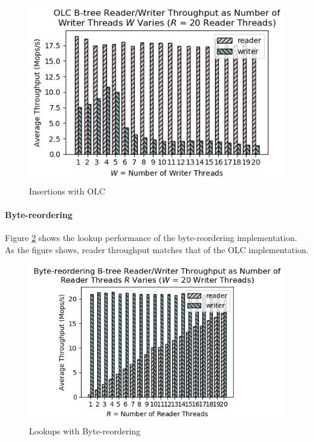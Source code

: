 \documentclass[twocolumn]{article}
\begin{document}
\begin{figure}[ht]
    \centering \includegraphics[width=\columnwidth]{figures/olc_r20_w1-20_avg.png}
    \caption{Insertions with OLC \label{fig:olcinsert}}
\end{figure}

\paragraph{Byte-reordering}

Figure \ref{fig:brlookup} shows the lookup performance of the byte-reordering
implementation. As the figure shows, reader throughput matches that of the OLC
implementation.

\begin{figure}[ht]
    \centering \includegraphics[width=\columnwidth]{figures/br_w20_r1-20_avg.png}
    \caption{Lookups with Byte-reordering \label{fig:brlookup}}
\end{figure}
\end{document}
